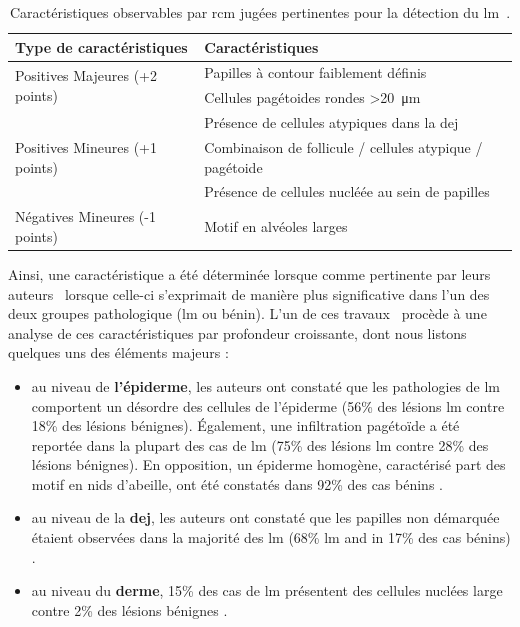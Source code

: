 \begin{table}[H]
\centering
    \begin{tabular}{ll}
        \toprule
        Type de caractéristiques                        & Caractéristiques                                              \\\hline
        \multirow{2}{*}{Positives Majeures (+2 points)} & Papilles à contour faiblement définis                         \\\cline{2-2}
                                                        & Cellules pagétoides rondes >\SI{20}{\micro\metre}             \\\hline
        \multirow{3}{*}{Positives Mineures (+1 points)} & Présence de cellules atypiques dans la \gls{dej}              \\\cline{2-2}
                                                        & Combinaison de follicule / cellules atypique / pagétoide      \\\cline{2-2}
                                                        & Présence de cellules nucléée au sein de papilles              \\\hline
        Négatives Mineures (-1 points)                  & Motif en alvéoles larges                                      \\
        \bottomrule
    \end{tabular}
\caption{Caractéristiques observables par \gls{rcm} jugées pertinentes pour la détection du \gls{lm}~\cite{Guitera2010}.}
\label{tab:rcm_algorithm_lentigo}
\end{table}\par
 
Ainsi, une caractéristique a été déterminée lorsque comme pertinente par leurs auteurs~\cite{Pellacani2007, Guitera2010} lorsque celle-ci s'exprimait de manière plus significative dans l'un des deux groupes pathologique (\gls{lm} ou bénin). L'un de ces travaux~\cite{Guitera2010} procède à une analyse de ces caractéristiques par profondeur croissante, dont nous listons quelques uns des éléments majeurs :
\begin{itemize}
    \item au niveau de \textbf{l'épiderme}, les auteurs ont constaté que les pathologies de \gls{lm} comportent un désordre des cellules de l'épiderme (56\% des lésions \gls{lm} contre 18\% des lésions bénignes). Également, une infiltration pagétoïde a été reportée dans la plupart des cas de \gls{lm} (75\% des lésions \gls{lm} contre 28\% des lésions bénignes). En opposition, un épiderme homogène, caractérisé part des motif en nids d'abeille, ont été constatés dans 92\% des cas bénins .
    \item au niveau de la \textbf{\gls{dej}}, les auteurs ont constaté que les papilles non démarquée étaient observées dans la majorité des \gls{lm} (68\% \gls{lm} and in 17\% des cas bénins) .
    \item au niveau du \textbf{derme}, 15\% des cas de \gls{lm} présentent des cellules nuclées large contre 2\% des lésions bénignes .
\end{itemize}\par

